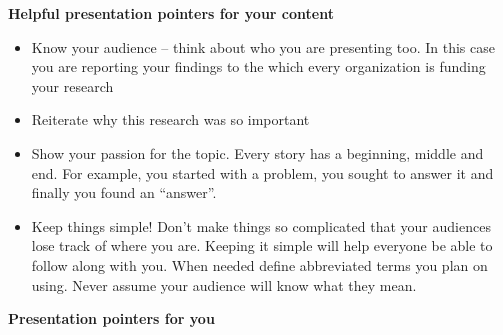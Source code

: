 \documentclass[
]{book}
\providecommand{\tightlist}{%
  \setlength{\itemsep}{0pt}\setlength{\parskip}{0pt}}
\begin{document}
\textbf{Helpful presentation pointers for your content}

\begin{itemize}
\tightlist
\item
  Know your audience -- think about who you are presenting too. In this case you are reporting your findings to the which every organization is funding your research
\item
  Reiterate why this research was so important
\item
  Show your passion for the topic. Every story has a beginning, middle and end. For example, you started with a problem, you sought to answer it and finally you found an ``answer''.
\item
  Keep things simple! Don't make things so complicated that your audiences lose track of where you are. Keeping it simple will help everyone be able to follow along with you. When needed define abbreviated terms you plan on using. Never assume your audience will know what they mean.
\end{itemize}

\textbf{Presentation pointers for you}
\end{document}
